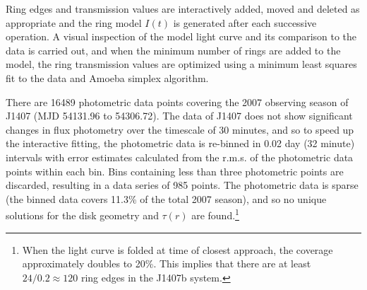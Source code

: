 \documentclass{emulateapj}
\newcommand{\taur}{\tau(r)}
\begin{document}
Ring edges and transmission values are interactively added, moved and
deleted as appropriate and the ring model $I(t)$ is generated after each
successive operation.
A visual inspection of the model light curve and its comparison to the
data is carried out, and when the minimum number of rings are added to
the model, the ring transmission values are optimized using a minimum
least squares fit to the data and Amoeba simplex algorithm.


There are 16489 photometric data points covering the 2007 observing
season of J1407 (MJD 54131.96 to 54306.72).
The data of J1407 does not show significant changes in flux photometry
over the timescale of 30 minutes, and so to speed up the interactive
fitting, the photometric data is re-binned in 0.02 day (32 minute)
intervals with error estimates calculated from the r.m.s. of the
photometric data points within each bin.
Bins containing less than three photometric points are discarded,
resulting in a data series of 985 points.
The photometric data is sparse (the binned data covers 11.3\% of the
total 2007 season), and so no unique solutions for the disk geometry and
$\taur$ are found.\footnote{When the light curve is folded at time of
closest approach, the coverage approximately doubles to 20\%.
This implies that there are at least $24/0.2\approx 120$ ring edges
in the J1407b system.}

\capstartfalse
\end{document}
